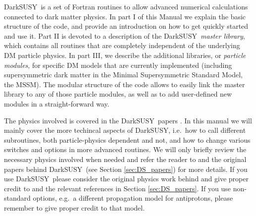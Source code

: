 \documentclass[a4paper,10pt,oneside]{book}
\newcommand{\comment}[1]{}
\newcommand{\ds}{{\sffamily DarkSUSY}}
\newenvironment{allsubs}{\begin{list}{}{\setlength{\labelsep}{0.0 cm}
\setlength{\labelwidth}{0.0 cm} \setlength{\leftmargin}{0.0 cm}
\setlength{\itemsep}{0.6ex} \setlength{\topsep}{\itemsep}}}{\end{list}}
\newenvironment{subs}{\begin{list}{}{\setlength{\labelwidth}{2.0 cm}
\setlength{\labelsep}{0.5 cm} \setlength{\leftmargin}{3.0 cm}
\setlength{\itemsep}{0.0 cm} \setlength{\parsep}{0.0 cm}
\setlength{\topsep}{0.0 cm} \setlength{\parskip}{0.0 cm}}}{\end{list}}
\newenvironment{sub}[1]%
{\begin{allsubs}\item \tw{#1\raisebox{-0.5ex}{}}\hrule\begin{subs}}
{\end{subs}\end{allsubs}}
\newcommand{\lfv}[1]{\makebox[1.5 cm][l]{\sffamily #1}}   %
\newcommand{\itv}[2]{\item[\lfv{#1 \hfill #2}]}
\newcommand{\tw}[1]{\textsf{#1}}
\newcommand{\ftb}[1]{{\bfseries \sffamily #1}}
\begin{document}
\ds\ is a set of Fortran routines to allow advanced numerical calculations
connected to dark matter physics. In part I of this Manual we explain the
basic structure of the code, and provide an introduction on how to get
quickly started and use it. Part II is devoted to a description of the 
\ds\ {\it master library}, which contains all routines that are completely independent
of the underlying DM particle physics.
In part III, we describe the additional libraries, or {\it particle modules}, for 
specific DM models that are currently implemented (including
supersymmetric dark matter in the Minimal Supersymmetric Standard
Model, the MSSM). The modular structure of the code allows to easily
link the master library to any of those particle modules, as well as to add
user-defined new modules in a straight-forward way.

The physics involved is covered in the \ds\ papers
\cite{ds4,ds6}. In this manual we will mainly cover the more techincal
aspects of \ds, i.e.~how to call different subroutines, both particle-physics 
dependent and not, and how to change various switches and options in more
advanced routines. We will only briefly review the necessary
physics involved when needed and refer the reader to \cite{ds4,ds6}
and the original papers behind \ds\ (see Section \ref{sec:DS_papers}) for more
details. If you use \ds\, please consider the original physics work
behind and give proper credit to \cite{ds6} and the relevant
references in Section \ref{sec:DS_papers}. If you use non-standard options,
e.g.\ a different propagation model for antiprotons, please remember
to give proper credit to that model.

\comment{We don't follow the style conventions, so I have simply commented
them out for the moment}


\end{document}

